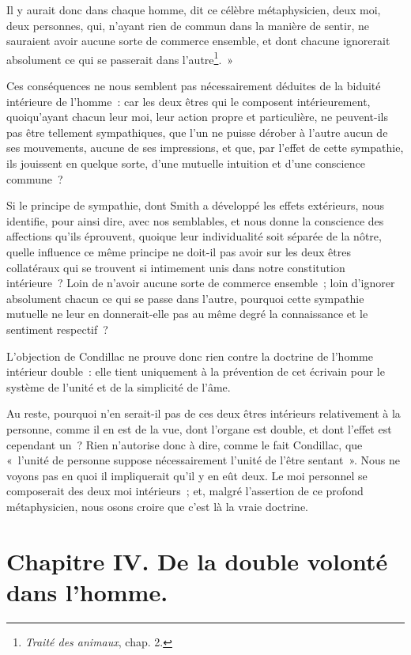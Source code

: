 \documentclass[french,twoside]{book} %
\newcommand\chapteropen{} %
\newcommand\chaptercont{} %
\newcommand\chapterclose{} %
\begin{document}
\chaptercont
\noindent Il y aurait donc dans chaque homme, dit ce célèbre métaphysicien, deux moi, deux personnes, qui, n’ayant rien de commun dans la manière de sentir, ne sauraient avoir aucune sorte de commerce ensemble, et dont chacune ignorerait absolument ce qui se passerait dans l’autre\footnote{{\itshape Traité des animaux}, chap. 2.}. »\par
Ces conséquences ne nous semblent pas nécessairement déduites de la biduité intérieure de l’homme : car les deux êtres qui le composent intérieurement, quoiqu’ayant chacun leur moi, leur action propre et particulière, ne peuvent-ils pas être tellement sympathiques, que l’un ne puisse dérober à l’autre aucun de ses mouvements, aucune de ses impressions, et que, par l’effet de cette sympathie, ils jouissent en quelque sorte, d’une mutuelle intuition et d’une conscience commune ?\par
Si le principe de sympathie, dont Smith a développé les effets extérieurs, nous identifie, pour ainsi dire, avec nos semblables, et nous donne la conscience des affections qu’ils éprouvent, quoique leur individualité soit séparée de la nôtre, quelle influence ce même principe ne doit-il pas avoir sur les deux êtres collatéraux qui se trouvent si intimement unis dans notre constitution intérieure ? Loin de n’avoir aucune sorte de commerce ensemble ; loin d’ignorer absolument chacun ce qui se passe dans l’autre, pourquoi cette sympathie mutuelle ne leur en donnerait-elle pas au même degré la connaissance et le sentiment respectif ?\par
L’objection de Condillac ne prouve donc rien contre la doctrine de l’homme intérieur double : elle tient uniquement à la prévention de cet écrivain pour le système de l’unité et de la simplicité de l’âme.\par
Au reste, pourquoi n’en serait-il pas de ces deux êtres intérieurs relativement à la personne, comme il en est de la vue, dont l’organe est double, et dont l’effet est cependant un ? Rien n’autorise donc à dire, comme le fait Condillac, que « l’unité de personne suppose nécessairement l’unité de l’être sentant ». Nous ne voyons pas en quoi il impliquerait qu’il y en eût deux. Le moi personnel se composerait des deux moi intérieurs ; et, malgré l’assertion de ce profond métaphysicien, nous osons croire que c’est là la vraie doctrine.
\chapterclose


\chapteropen
\chapter[{Chapitre IV. De la double volonté dans l’homme.}]{Chapitre IV. De la double volonté dans l’homme.}\renewcommand{\leftmark}{Chapitre IV. De la double volonté dans l’homme.}
\end{document}
